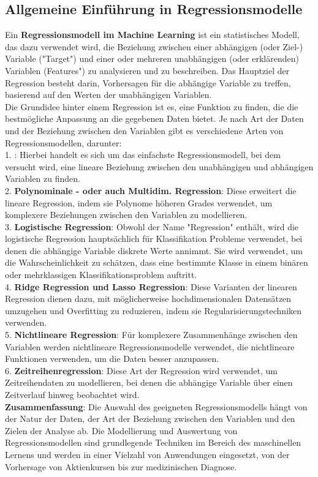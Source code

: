 \documentclass[12pt]{article}
\begin{document}
\subsection{Allgemeine Einführung in Regressionsmodelle}

Ein \textbf{Regressionsmodell im Machine Learning} ist ein statistisches Modell, das dazu verwendet wird, die Beziehung zwischen einer abhängigen (oder Ziel-) Variable ("Target") und einer oder mehreren unabhängigen (oder erklärenden) Variablen (Features") zu analysieren und zu beschreiben. Das Hauptziel der Regression besteht darin, Vorhersagen für die abhängige Variable zu treffen, basierend auf den Werten der unabhängigen Variablen.\\
Die Grundidee hinter einem Regression ist es, eine Funktion zu finden, die die bestmögliche Anpassung an die gegebenen Daten bietet. Je nach Art der Daten und der Beziehung zwischen den Variablen gibt es verschiedene Arten von Regressionsmodellen, darunter:\\[0.2cm] 
% 
1. \textbf{{\color{blue}{Lineare Regression}}}:  Hierbei handelt es sich um das einfachste Regressionsmodell, bei dem versucht wird, eine lineare Beziehung zwischen den unabhängigen und abhängigen Variablen zu finden.\\[0.2cm]
%  
2. \textbf{Polynominale - oder auch Multidim. Regression}: Diese erweitert die lineare Regression, indem sie Polynome höheren Grades verwendet, um komplexere Beziehungen zwischen den Variablen zu modellieren.\\[0.2cm]
% 
3. \textbf{Logistische Regression}: Obwohl der Name "Regression" enthält, wird die logistische Regression hauptsächlich für Klassifikation Probleme verwendet, bei denen die abhängige Variable diskrete Werte annimmt. Sie wird verwendet, um die Wahrscheinlichkeit zu schätzen, dass eine bestimmte Klasse in einem binären oder mehrklassigen Klassifikationsproblem auftritt.\\[0.2cm]
%  
4. \textbf{Ridge Regression und Lasso Regression}: Diese Varianten der linearen Regression dienen dazu, mit möglicherweise hochdimensionalen Datensätzen umzugehen und Overfitting zu reduzieren, indem sie Regularisierungstechniken verwenden.\\[0.2cm] 
% 
5. \textbf{Nichtlineare Regression}: Für komplexere Zusammenhänge zwischen den Variablen werden nichtlineare Regressionsmodelle verwendet, die nichtlineare Funktionen verwenden, um die Daten besser anzupassen.\\[0.2cm]
% 
6. \textbf{Zeitreihenregression}: Diese Art der Regression wird verwendet, um Zeitreihendaten zu modellieren, bei denen die abhängige Variable über einen Zeitverlauf hinweg beobachtet wird.\\[0.2cm]
% 
\textbf{Zusammenfassung}: Die Auswahl des geeigneten Regressionsmodells hängt von der Natur der Daten, der Art der Beziehung zwischen den Variablen und den Zielen der Analyse ab. Die Modellierung und Auswertung von Regressionsmodellen sind grundlegende Techniken im Bereich des maschinellen Lernens und werden in einer Vielzahl von Anwendungen eingesetzt, von der Vorhersage von Aktienkursen bis zur medizinischen Diagnose. 
\end{document}
